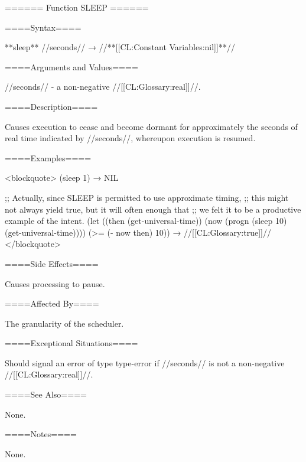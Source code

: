 ====== Function SLEEP ======

====Syntax====

**sleep** //seconds// → //**[[CL:Constant Variables:nil]]**//

====Arguments and Values====

//seconds// - a non-negative //[[CL:Glossary:real]]//.

====Description====

Causes execution to cease and become dormant for approximately the seconds of real time indicated by //seconds//, whereupon execution is resumed.

====Examples====

<blockquote> (sleep 1) → NIL

;; Actually, since SLEEP is permitted to use approximate timing, ;; this might not always yield true, but it will often enough that ;; we felt it to be a productive example of the intent. (let ((then (get-universal-time)) (now (progn (sleep 10) (get-universal-time)))) (>= (- now then) 10)) → //[[CL:Glossary:true]]// </blockquote>

====Side Effects====

Causes processing to pause.

====Affected By====

The granularity of the scheduler.

====Exceptional Situations====

Should signal an error of type type-error if //seconds// is not a non-negative //[[CL:Glossary:real]]//.

====See Also====

None.

====Notes====

None.

